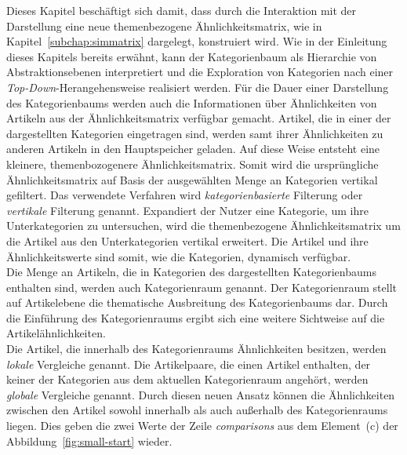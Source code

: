 Dieses Kapitel beschäftigt sich damit, dass durch die Interaktion mit der Darstellung eine neue themenbezogene Ähnlichkeitsmatrix, wie in Kapitel~\ref{subchap:simmatrix} dargelegt, konstruiert wird.
Wie in der Einleitung dieses Kapitels bereits erwähnt, kann der Kategorienbaum als Hierarchie von Abstraktionsebenen interpretiert und die Exploration von Kategorien nach einer \emph{Top-Down}-Herangehensweise realisiert werden.
Für die Dauer einer Darstellung des Kategorienbaums werden auch die Informationen über Ähnlichkeiten von Artikeln aus der Ähnlichkeitsmatrix verfügbar gemacht.
Artikel, die in einer der dargestellten Kategorien eingetragen sind, werden samt ihrer Ähnlichkeiten zu anderen Artikeln in den Hauptspeicher geladen.
Auf diese Weise entsteht eine kleinere, themenbozogenere Ähnlichkeitsmatrix.
Somit wird die ursprüngliche Ähnlichkeitsmatrix auf Basis der ausgewählten Menge an Kategorien vertikal gefiltert.
Das verwendete Verfahren wird \emph{kategorienbasierte} Filterung oder \emph{vertikale} Filterung genannt.
Expandiert der Nutzer eine Kategorie, um ihre Unterkategorien zu untersuchen, wird die themenbezogene Ähnlichkeitsmatrix um die Artikel aus den Unterkategorien vertikal erweitert.
Die Artikel und ihre Ähnlichkeitswerte sind somit, wie die Kategorien, dynamisch verfügbar.\\
Die Menge an Artikeln, die in Kategorien des dargestellten Kategorienbaums enthalten sind, werden auch Kategorienraum genannt. 
Der Kategorienraum stellt auf Artikelebene die thematische Ausbreitung des Kategorienbaums dar.
Durch die Einführung des Kategorienraums ergibt sich eine weitere Sichtweise auf die Artikelähnlichkeiten.\\
Die Artikel, die innerhalb des Kategorienraums Ähnlichkeiten besitzen, werden \emph{lokale} Vergleiche genannt.
Die Artikelpaare, die einen Artikel enthalten, der keiner der Kategorien aus dem aktuellen Kategorienraum angehört, werden \emph{globale} Vergleiche genannt.
Durch diesen neuen Ansatz können die Ähnlichkeiten zwischen den Artikel sowohl innerhalb als auch außerhalb des Kategorienraums liegen.
Dies geben die zwei Werte der Zeile \emph{comparisons} aus dem Element~(c) der Abbildung~\ref{fig:small-start} wieder.\\
